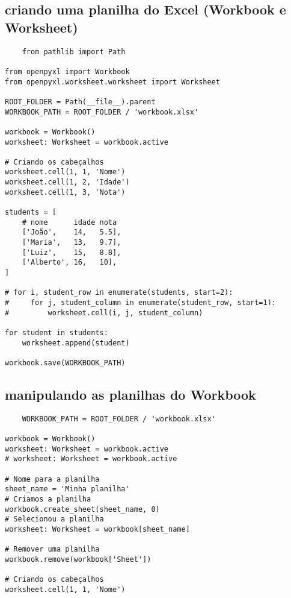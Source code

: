 \documentclass{article}
\begin{document}
\subsection{criando uma planilha do Excel (Workbook e Worksheet)}
\begin{lstlisting}
    from pathlib import Path

from openpyxl import Workbook
from openpyxl.worksheet.worksheet import Worksheet

ROOT_FOLDER = Path(__file__).parent
WORKBOOK_PATH = ROOT_FOLDER / 'workbook.xlsx'

workbook = Workbook()
worksheet: Worksheet = workbook.active

# Criando os cabeçalhos
worksheet.cell(1, 1, 'Nome')
worksheet.cell(1, 2, 'Idade')
worksheet.cell(1, 3, 'Nota')

students = [
    # nome      idade nota
    ['João',    14,   5.5],
    ['Maria',   13,   9.7],
    ['Luiz',    15,   8.8],
    ['Alberto', 16,   10],
]

# for i, student_row in enumerate(students, start=2):
#     for j, student_column in enumerate(student_row, start=1):
#         worksheet.cell(i, j, student_column)

for student in students:
    worksheet.append(student)

workbook.save(WORKBOOK_PATH)

\end{lstlisting}

\subsection{manipulando as planilhas do Workbook}
\begin{lstlisting}
    WORKBOOK_PATH = ROOT_FOLDER / 'workbook.xlsx'

workbook = Workbook()
worksheet: Worksheet = workbook.active
# worksheet: Worksheet = workbook.active

# Nome para a planilha
sheet_name = 'Minha planilha'
# Criamos a planilha
workbook.create_sheet(sheet_name, 0)
# Selecionou a planilha
worksheet: Worksheet = workbook[sheet_name]

# Remover uma planilha
workbook.remove(workbook['Sheet'])

# Criando os cabeçalhos
worksheet.cell(1, 1, 'Nome')

\end{lstlisting}
\end{document}
